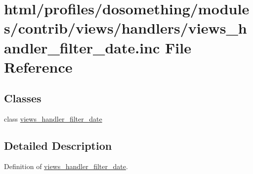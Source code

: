 \hypertarget{views__handler__filter__date_8inc}{
\section{html/profiles/dosomething/modules/contrib/views/handlers/views\_\-handler\_\-filter\_\-date.inc File Reference}
\label{views__handler__filter__date_8inc}
}
\subsection*{Classes}
\begin{DoxyCompactItemize}
\item 
class \hyperlink{classviews__handler__filter__date}{views\_\-handler\_\-filter\_\-date}
\end{DoxyCompactItemize}


\subsection{Detailed Description}
Definition of \hyperlink{classviews__handler__filter__date}{views\_\-handler\_\-filter\_\-date}. 